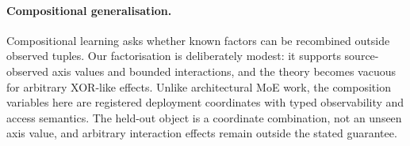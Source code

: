\paragraph{Compositional generalisation.}
Compositional learning asks whether known factors can be recombined outside observed tuples. Our factorisation is deliberately modest: it supports source-observed axis values and bounded interactions, and the theory becomes vacuous for arbitrary XOR-like effects. Unlike architectural MoE work, the composition variables here are registered deployment coordinates with typed observability and access semantics. The held-out object is a coordinate combination, not an unseen axis value, and arbitrary interaction effects remain outside the stated guarantee.
